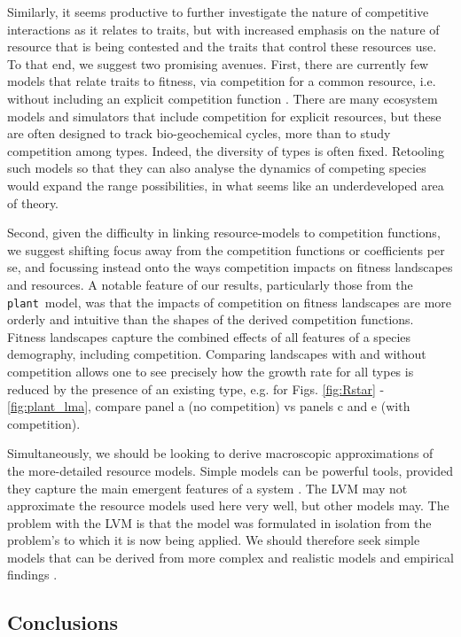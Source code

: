 \documentclass[a4paper,11pt]{article}
\newcommand{\plant}{{\tt plant}}
\begin{document}
Similarly, it seems productive to further investigate the nature of competitive interactions as it relates to traits, but with increased emphasis on the nature of resource that is being contested and the traits that control these resources use. To that end, we suggest two promising avenues. First, there are currently few models that relate traits to fitness, via competition for a common resource, i.e. without including an explicit competition function \citep{DAndrea-2016a}. There are many ecosystem models and simulators that include competition for explicit resources, but these are often designed to track bio-geochemical cycles, more than to study competition among types. Indeed, the diversity of types is often fixed. Retooling such models so that they can also analyse the dynamics of competing species would expand the range possibilities, in what seems like an underdeveloped area of theory. 

Second, given the difficulty in linking resource-models to competition functions, we suggest shifting focus away from the competition functions or coefficients per se, and focussing instead onto the ways competition impacts on fitness landscapes and resources. A notable feature of our results, particularly those from the \plant\ model, was that the impacts of competition on fitness landscapes are more orderly and intuitive than the shapes of the derived competition functions. Fitness landscapes capture the combined effects of all features of a species demography, including competition. Comparing landscapes with and without competition allows one to see precisely how the growth rate for all types is reduced by the presence of an existing type, e.g. for Figs. \ref{fig:Rstar} - \ref{fig:plant_lma}, compare panel a (no competition) vs panels c and e (with competition). 

Simultaneously, we should be looking to derive macroscopic approximations of the more-detailed resource models. Simple models can be powerful tools, provided they capture the main emergent features of a system \citep{Levin-2006}. The LVM may not approximate the resource models used here very well, but other models may. The problem with the LVM is that the model was formulated in isolation from the problem's to which it is now being applied. We should therefore seek simple models that can be derived from more complex and realistic models and empirical findings \citep[e.g.][]{Champagnat-2006}.

\subsection{Conclusions}
\end{document}
